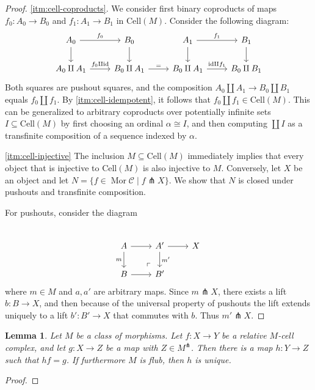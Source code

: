 \documentclass[a4paper]{article}
\newtheorem{lemma}[theorem]{Lemma}
\theoremstyle{remark}
\theoremstyle{definition}
\begin{document}
\begin{proof}
  \ref{itm:cell-coproducts}.
  We consider first binary coproducts of maps $f_0 : A_0 \rightarrow B_0$ and $f_1 : A_1 \rightarrow B_1$ in $\mathrm{Cell}(M)$.
  Consider the following diagram:
  \begin{equation}
    \begin{tikzcd}
      A_0 \arrow[d] \arrow[r, "f_0"] & B_0 \arrow[d] & A_1 \arrow[d] \arrow[r, "f_1"] & B_1 \arrow[d] \\
      A_0 \amalg A_1 \arrow[r, "f_0 \amalg \mathrm{id}"] & B_0 \amalg A_1 \arrow[r, "="] & B_0 \amalg A_1 \arrow[r, "\mathrm{id} \amalg f_1"] & B_0 \amalg B_1
    \end{tikzcd}
  \end{equation}
  Both squares are pushout squares, and the composition $A_0 \amalg A_1 \rightarrow B_0 \amalg B_1$ equals $f_0 \amalg f_1$.
  By \ref{itm:cell-idempotent}, it follows that $f_0 \amalg f_1 \in \mathrm{Cell}(M)$.
  This can be generalized to arbitrary coproducts over potentially infinite sets $I \subseteq \mathrm{Cell}(M)$ by first choosing an ordinal $\alpha \cong I$, and then computing $\coprod I$ as a transfinite composition of a sequence indexed by $\alpha$.

  \ref{itm:cell-injective}
  The inclusion $M \subseteq \mathrm{Cell}(M)$ immediately implies that every object that is injective to $\mathrm{Cell}(M)$ is also injective to $M$.
  Conversely, let $X$ be an object and let $N = \{f \in \operatorname{Mor} \mathcal{C} \mid f \pitchfork X \}$.
  We show that $N$ is closed under pushouts and transfinite composition.

  For pushouts, consider the diagram
  \begin{equation}
    \begin{tikzcd} \\
      A \arrow[r] \arrow[d, "m"'] \arrow[dr, very near end, phantom, "\ulcorner" description] & A' \arrow[d, "m'"] \arrow[r] & X \\
      B \arrow[r] & B'
    \end{tikzcd}
  \end{equation}
  where $m \in M$ and $a, a'$ are arbitrary maps.
  Since $m \pitchfork X$, there exists a lift $b : B \rightarrow X$, and then because of the universal property of pushouts the lift extends uniquely to a lift $b' : B' \rightarrow X$ that commutes with $b$.
  Thus $m' \pitchfork X$.
\end{proof}

\begin{lemma}
  \label{lem:factoring-via-cell-complexes}
  Let $M$ be a class of morphisms.
  Let $f : X \rightarrow Y$ be a relative $M$-cell complex, and let $g : X \rightarrow Z$ be a map with $Z \in M^\pitchfork$.
  Then there is a map $h : Y \rightarrow Z$ such that $hf = g$.
  If furthermore $M$ is flub, then $h$ is unique.
\end{lemma}
\begin{proof}
\end{proof}
\end{document}
